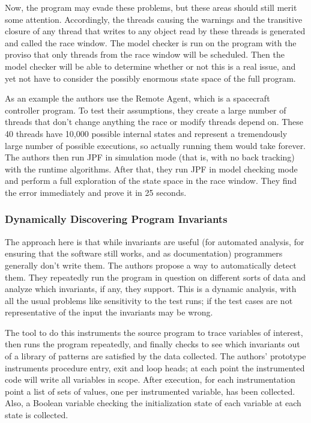 \documentclass{article}
\begin{document}
\begin{multicols}{2}
Now, the program may evade these problems, but these areas should
still merit some attention.  Accordingly, the threads causing the
warnings and the transitive closure of any thread that writes to any
object read by these threads is generated and called the race window.
The model checker is run on the program with the proviso that only
threads from the race window will be scheduled.  Then the model
checker will be able to determine whether or not this is a real issue,
and yet not have to consider the possibly enormous state space of the
full program.

As an example the authors use the Remote Agent, which is a spacecraft
controller program.  To test their assumptions, they create a large
number of threads that don't change anything the race or modify
threads depend on.  These 40 threads have 10,000 possible internal
states and represent a tremendously large number of possible
executions, so actually running them would take forever.  The authors
then run JPF in simulation mode (that is, with no back tracking) with
the runtime algorithms.  After that, they run JPF in model checking
mode and perform a full exploration of the state space in the race
window.  They find the error immediately and prove it in 25 seconds.

\subsubsection{Dynamically Discovering Program Invariants~\cite{302467}}

The approach here is that while invariants are useful (for automated
analysis, for ensuring that the software still works, and as
documentation) programmers generally don't write them.  The authors
propose a way to automatically detect them.  They repeatedly run the
program in question on different sorts of data and analyze which
invariants, if any, they support.  This is a dynamic analysis, with
all the usual problems like sensitivity to the test runs; if the test
cases are not representative of the input the invariants may be wrong.

The tool to do this instruments the source program to trace variables
of interest, then runs the program repeatedly, and finally checks to
see which invariants out of a library of patterns are satisfied by the
data collected.  The authors' prototype instruments procedure entry,
exit and loop heads; at each point the instrumented code will write
all variables in scope.  After execution, for each instrumentation
point a list of sets of values, one per instrumented variable, has
been collected.  Also, a Boolean variable checking the initialization
state of each variable at each state is collected.


\end{multicols}
\end{document}
